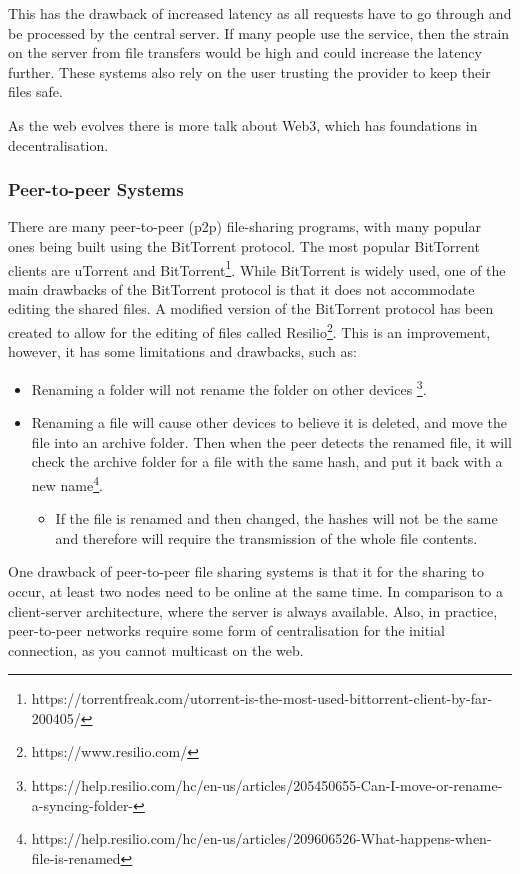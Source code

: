 \documentclass[12pt]{article}
\begin{document}
This has the drawback of increased latency as all requests have to go through and be processed by the central server. If many people use the service, then the strain on the server from file transfers would be high and could increase the latency further. These systems also rely on the user trusting the provider to keep their files safe. \par

As the web evolves there is more talk about Web3\cite{WhatIsWeb3}, which has foundations in decentralisation.
\subsubsection{Peer-to-peer Systems}
There are many peer-to-peer (p2p) file-sharing programs, with many popular ones being built using the BitTorrent protocol. The most popular BitTorrent clients are uTorrent and BitTorrent\footnote{https://torrentfreak.com/utorrent-is-the-most-used-bittorrent-client-by-far-200405/}. While BitTorrent is widely used, one of the main drawbacks of the BitTorrent protocol is that it does not accommodate editing the shared files. A modified version of the  BitTorrent protocol has been created to allow for the editing of files called Resilio\footnote{https://www.resilio.com/}. This is an improvement, however, it has some limitations and drawbacks, such as:
\begin{itemize}
    \item Renaming a folder will not rename the folder on other devices \footnote{https://help.resilio.com/hc/en-us/articles/205450655-Can-I-move-or-rename-a-syncing-folder-}.
    \item Renaming a file will cause other devices to believe it is deleted, and move the file into an archive folder. Then when the peer detects the renamed file, it will check the archive folder for a file with the same hash, and put it back with a new name\footnote{https://help.resilio.com/hc/en-us/articles/209606526-What-happens-when-file-is-renamed}.
          \begin{itemize}
              \item If the file is renamed and then changed, the hashes will not be the same and therefore will require the transmission of the whole file contents.
          \end{itemize}
\end{itemize}  \par
One drawback of peer-to-peer file sharing systems is that it for the sharing to occur, at least two nodes need to be online at the same time. In comparison to a client-server architecture, where the server is always available. Also, in practice, peer-to-peer networks require some form of centralisation for the initial connection, as you cannot multicast on the web.
\end{document}
